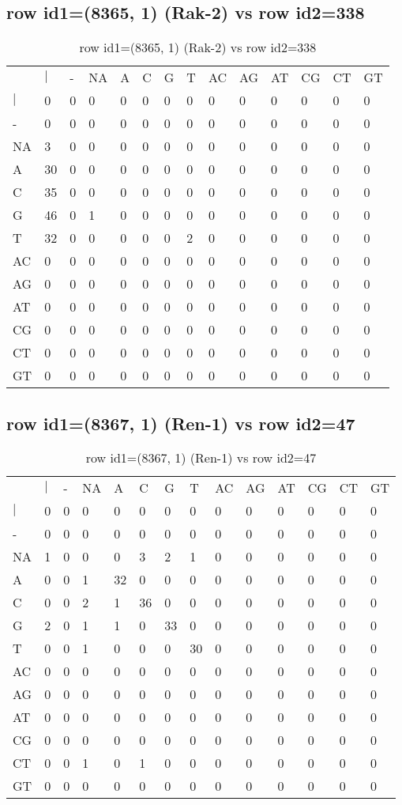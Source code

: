 \subsection{row id1=(8365, 1) (Rak-2) vs row id2=338}
\begin{center}
\begin{longtable}{|l|l|l|l|l|l|l|l|l|l|l|l|l|l|}
\caption{row id1=(8365, 1) (Rak-2) vs row id2=338} \label{table_dm394}\\
\hline
\\
\hline
&$|$&-&NA&A&C&G&T&AC&AG&AT&CG&CT&GT\\
$|$&0&0&0&0&0&0&0&0&0&0&0&0&0\\
-&0&0&0&0&0&0&0&0&0&0&0&0&0\\
NA&3&0&0&0&0&0&0&0&0&0&0&0&0\\
A&30&0&0&0&0&0&0&0&0&0&0&0&0\\
C&35&0&0&0&0&0&0&0&0&0&0&0&0\\
G&46&0&1&0&0&0&0&0&0&0&0&0&0\\
T&32&0&0&0&0&0&2&0&0&0&0&0&0\\
AC&0&0&0&0&0&0&0&0&0&0&0&0&0\\
AG&0&0&0&0&0&0&0&0&0&0&0&0&0\\
AT&0&0&0&0&0&0&0&0&0&0&0&0&0\\
CG&0&0&0&0&0&0&0&0&0&0&0&0&0\\
CT&0&0&0&0&0&0&0&0&0&0&0&0&0\\
GT&0&0&0&0&0&0&0&0&0&0&0&0&0\\
\hline
\end{longtable}
\end{center}

\subsection{row id1=(8367, 1) (Ren-1) vs row id2=47}
\begin{center}
\begin{longtable}{|l|l|l|l|l|l|l|l|l|l|l|l|l|l|}
\caption{row id1=(8367, 1) (Ren-1) vs row id2=47} \label{table_dm396}\\
\hline
\\
\hline
&$|$&-&NA&A&C&G&T&AC&AG&AT&CG&CT&GT\\
$|$&0&0&0&0&0&0&0&0&0&0&0&0&0\\
-&0&0&0&0&0&0&0&0&0&0&0&0&0\\
NA&1&0&0&0&3&2&1&0&0&0&0&0&0\\
A&0&0&1&32&0&0&0&0&0&0&0&0&0\\
C&0&0&2&1&36&0&0&0&0&0&0&0&0\\
G&2&0&1&1&0&33&0&0&0&0&0&0&0\\
T&0&0&1&0&0&0&30&0&0&0&0&0&0\\
AC&0&0&0&0&0&0&0&0&0&0&0&0&0\\
AG&0&0&0&0&0&0&0&0&0&0&0&0&0\\
AT&0&0&0&0&0&0&0&0&0&0&0&0&0\\
CG&0&0&0&0&0&0&0&0&0&0&0&0&0\\
CT&0&0&1&0&1&0&0&0&0&0&0&0&0\\
GT&0&0&0&0&0&0&0&0&0&0&0&0&0\\
\hline
\end{longtable}
\end{center}

